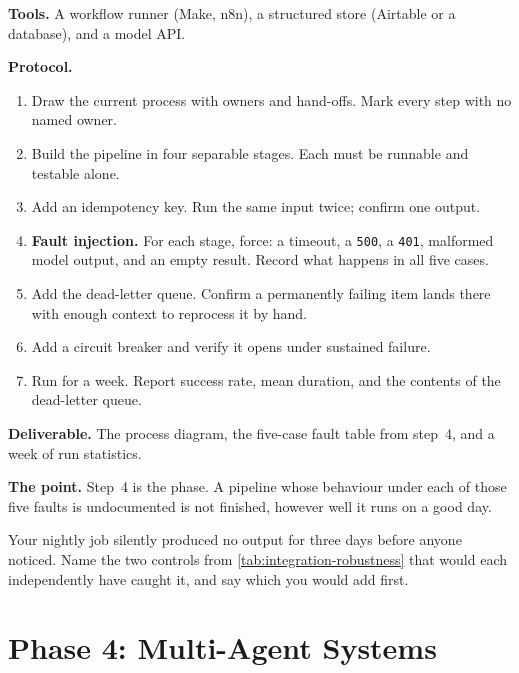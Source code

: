 \begin{practicallab}
\textbf{Tools.} A workflow runner (Make, n8n), a structured store (Airtable or
a database), and a model API.

\textbf{Protocol.}
\begin{enumerate}
  \item Draw the current process with owners and hand-offs. Mark every step
        with no named owner.
  \item Build the pipeline in four separable stages. Each must be runnable and
        testable alone.
  \item Add an idempotency key. Run the same input twice; confirm one output.
  \item \textbf{Fault injection.} For each stage, force: a timeout, a
        \texttt{500}, a \texttt{401}, malformed model output, and an empty
        result. Record what happens in all five cases.
  \item Add the dead-letter queue. Confirm a permanently failing item lands
        there with enough context to reprocess it by hand.
  \item Add a circuit breaker and verify it opens under sustained failure.
  \item Run for a week. Report success rate, mean duration, and the contents of
        the dead-letter queue.
\end{enumerate}

\textbf{Deliverable.} The process diagram, the five-case fault table from
step~4, and a week of run statistics.

\textbf{The point.} Step~4 is the phase. A pipeline whose behaviour under each
of those five faults is undocumented is not finished, however well it runs on
a good day.
\end{practicallab}

\begin{checkpoint}
Your nightly job silently produced no output for three days before anyone
noticed. Name the two controls from \cref{tab:integration-robustness} that
would each independently have caught it, and say which you would add first.
\end{checkpoint}

\section{Phase 4: Multi-Agent Systems}

